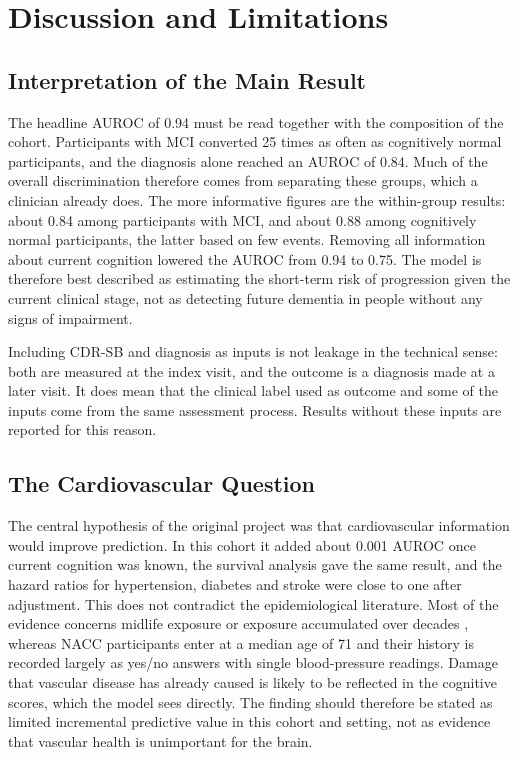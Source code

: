 \chapter{Discussion and Limitations}
\label{ch:discussion}

\section{Interpretation of the Main Result}

The headline AUROC of 0.94 must be read together with the composition of the cohort. Participants with MCI converted 25 times as often as cognitively normal participants, and the diagnosis alone reached an AUROC of 0.84. Much of the overall discrimination therefore comes from separating these groups, which a clinician already does. The more informative figures are the within-group results: about 0.84 among participants with MCI, and about 0.88 among cognitively normal participants, the latter based on few events. Removing all information about current cognition lowered the AUROC from 0.94 to 0.75. The model is therefore best described as estimating the short-term risk of progression given the current clinical stage, not as detecting future dementia in people without any signs of impairment.

Including CDR-SB and diagnosis as inputs is not leakage in the technical sense: both are measured at the index visit, and the outcome is a diagnosis made at a later visit. It does mean that the clinical label used as outcome and some of the inputs come from the same assessment process. Results without these inputs are reported for this reason.

\section{The Cardiovascular Question}

The central hypothesis of the original project was that cardiovascular information would improve prediction. In this cohort it added about 0.001 AUROC once current cognition was known, the survival analysis gave the same result, and the hazard ratios for hypertension, diabetes and stroke were close to one after adjustment. This does not contradict the epidemiological literature. Most of the evidence concerns midlife exposure or exposure accumulated over decades \cite{sierra2020,wang2026}, whereas NACC participants enter at a median age of 71 and their history is recorded largely as yes/no answers with single blood-pressure readings. Damage that vascular disease has already caused is likely to be reflected in the cognitive scores, which the model sees directly. The finding should therefore be stated as limited incremental predictive value in this cohort and setting, not as evidence that vascular health is unimportant for the brain.

